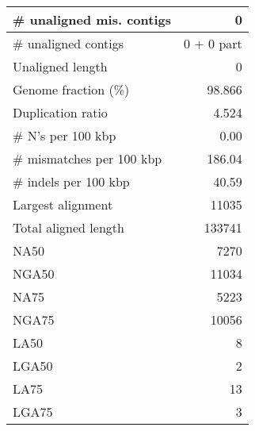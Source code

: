 \documentclass[12pt,a4paper]{article}
\begin{document}
\begin{table}[ht]
\begin{center}
\begin{tabular}{|l*{1}{|r}|}
\# unaligned mis. contigs & 0 \\ \hline
\# unaligned contigs & 0 + 0 part \\ \hline
Unaligned length & 0 \\ \hline
Genome fraction (\%) & 98.866 \\ \hline
Duplication ratio & 4.524 \\ \hline
\# N's per 100 kbp & 0.00 \\ \hline
\# mismatches per 100 kbp & 186.04 \\ \hline
\# indels per 100 kbp & 40.59 \\ \hline
Largest alignment & 11035 \\ \hline
Total aligned length & 133741 \\ \hline
NA50 & 7270 \\ \hline
NGA50 & 11034 \\ \hline
NA75 & 5223 \\ \hline
NGA75 & 10056 \\ \hline
LA50 & 8 \\ \hline
LGA50 & 2 \\ \hline
LA75 & 13 \\ \hline
LGA75 & 3 \\ \hline
\end{tabular}
\end{center}
\end{table}
\end{document}
